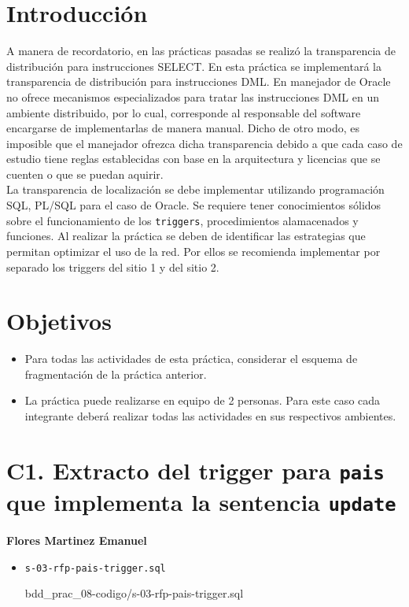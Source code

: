 \documentclass{article}
\newcommand{\codedir}{bdd_prac_08-codigo}
\begin{document}
\newpage

\section*{Introducción}

A manera de recordatorio, en las prácticas pasadas se realizó la transparencia
de distribución para instrucciones SELECT. En esta práctica se implementará la
transparencia de distribución para instrucciones DML. En manejador de Oracle no
ofrece mecanismos especializados para tratar las instrucciones DML en un
ambiente distribuido, por lo cual, corresponde al responsable del software
encargarse de implementarlas de manera manual. Dicho de otro modo, es imposible
que el manejador ofrezca dicha transparencia debido a que cada caso de estudio
tiene reglas establecidas con base en la arquitectura y licencias que se cuenten
o que se puedan aquirir.\\

La transparencia de localización se debe implementar utilizando programación
SQL, PL/SQL para el caso de Oracle. Se requiere tener conocimientos sólidos
sobre el funcionamiento de los \texttt{triggers}, procedimientos alamacenados y
funciones. Al realizar la práctica se deben de identificar las estrategias que
permitan optimizar el uso de la red. Por ellos se recomienda implementar por
separado los triggers del sitio 1 y del sitio 2.


\section*{Objetivos}

\begin{itemize}
  \item Para todas las actividades de esta práctica, considerar el esquema de
  fragmentación de la práctica anterior.  
  \item La práctica puede realizarse en equipo de 2 personas. Para este caso
    cada integrante deberá realizar todas las actividades en sus respectivos
ambientes.
\end{itemize}

\section*{C1. Extracto del trigger para \texttt{pais} que implementa la 
sentencia \texttt{update}}
\textbf{Flores Martinez Emanuel}
\begin{itemize}
  \item \texttt{s-03-rfp-pais-trigger.sql}
  
  {\codedir/s-03-rfp-pais-trigger.sql}
\end{itemize}
\end{document}
